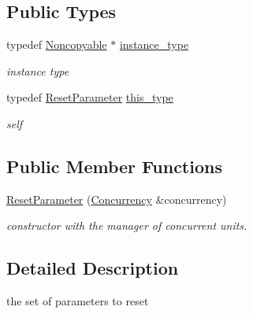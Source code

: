 \subsection*{Public Types}
\begin{DoxyCompactItemize}
\item 
\hypertarget{classhryky_1_1_noncopyable_aaf87abb55f700af85ecb0895f6178821}{typedef \hyperlink{classhryky_1_1_noncopyable}{Noncopyable} $\ast$ \hyperlink{classhryky_1_1_noncopyable_aaf87abb55f700af85ecb0895f6178821}{instance\-\_\-type}}\label{classhryky_1_1_noncopyable_aaf87abb55f700af85ecb0895f6178821}

\begin{DoxyCompactList}\small\item\em instance type \end{DoxyCompactList}\item 
\hypertarget{structhryky_1_1task_1_1distributor_1_1_base_1_1_reset_parameter_a9b8e7bc5f6c6da9ebea0495387681438}{typedef \hyperlink{structhryky_1_1task_1_1distributor_1_1_base_1_1_reset_parameter}{Reset\-Parameter} \hyperlink{structhryky_1_1task_1_1distributor_1_1_base_1_1_reset_parameter_a9b8e7bc5f6c6da9ebea0495387681438}{this\-\_\-type}}\label{structhryky_1_1task_1_1distributor_1_1_base_1_1_reset_parameter_a9b8e7bc5f6c6da9ebea0495387681438}

\begin{DoxyCompactList}\small\item\em self \end{DoxyCompactList}\end{DoxyCompactItemize}
\subsection*{Public Member Functions}
\begin{DoxyCompactItemize}
\item 
\hyperlink{structhryky_1_1task_1_1distributor_1_1_base_1_1_reset_parameter_a1b649aff20ad0e8259b7aea383ad2b1c}{Reset\-Parameter} (\hyperlink{classhryky_1_1task_1_1_concurrency}{Concurrency} \&concurrency)
\begin{DoxyCompactList}\small\item\em constructor with the manager of concurrent units. \end{DoxyCompactList}\end{DoxyCompactItemize}


\subsection{Detailed Description}
the set of parameters to reset 

